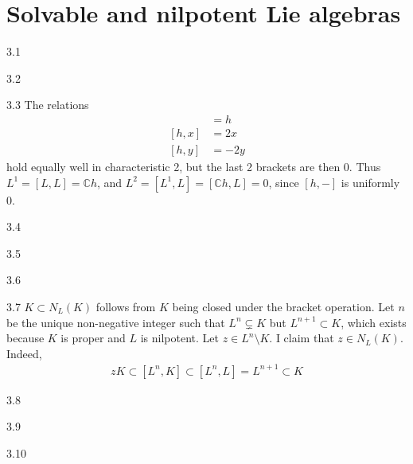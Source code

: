 \chapter{Solvable and nilpotent Lie algebras}

\begin{solution}{}{3.1}
    
\end{solution}

\begin{solution}{}{3.2}

\end{solution}

\begin{solution}{}{3.3}
    The relations
    \begin{align*}
        [x,y] &= h \\
        [h,x] &= 2x \\
        [h,y] &= -2y
    \end{align*}
    hold equally well in characteristic 2, but the last 2 brackets are then 0. Thus $ L^{1} = [L, L] = \mathbb{C}h $, and $ L^{2} = [L^{1}, L] = [ \mathbb{C}h, L] = 0 $, since $ [h, -] $ is uniformly 0.
\end{solution}

\begin{solution}{}{3.4}

\end{solution}

\begin{solution}{}{3.5}
    
\end{solution}

\begin{solution}{}{3.6}

\end{solution}

\begin{solution}{}{3.7}
    $ K \subset N_{L}(K) $ follows from $ K $ being closed under the bracket operation. Let $ n $ be the unique non-negative integer such that $ L^{n} \subsetneq K $ but $ L^{n+1} \subset K $, which exists because $ K $ is proper and $ L $ is nilpotent. Let $ z\in L^{n} \setminus K $. I claim that $ z\in N_{L}(K) $. Indeed,
    \begin{align*}
        zK \subset [L^{n}, K]
        \subset [L^{n}, L] = L^{n+1}
        \subset K
    \end{align*}
\end{solution}

\begin{solution}{}{3.8}

\end{solution}

\begin{solution}{}{3.9}
    
\end{solution}

\begin{solution}{}{3.10}

\end{solution}